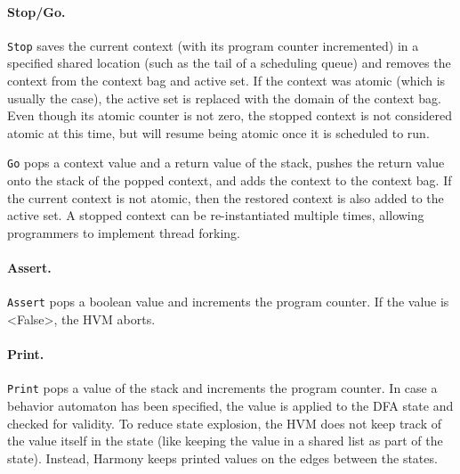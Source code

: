 \documentclass[twocolumn]{article}
\begin{document}

\paragraph{Stop/Go.} \texttt{Stop} saves the current context
(with its program counter incremented) in a specified shared location
(such as the tail of a scheduling queue) and removes the context
from the context bag and active set.  If the context was atomic
(which is usually the case), the active set is replaced with the
domain of the context bag.  Even though its atomic counter is not
zero, the stopped context is not considered atomic at this time,
but will resume being atomic once it is scheduled to run.

\texttt{Go} pops a context value and a return value of the stack,
pushes the return value onto the stack of the popped context, and adds
the context to the context bag.  If the current context is not atomic,
then the restored context is also added to the active set.
A stopped context can be re-instantiated multiple times, allowing
programmers to implement thread forking.

\paragraph{Assert.}  \texttt{Assert} pops a boolean value and increments
the program counter.  If the value is <{False}>, the HVM aborts.

\paragraph{Print.}  \texttt{Print} pops a value of the stack and increments
the program counter.  In case a behavior automaton has been specified, the
value is applied to the DFA state and checked for validity.
To reduce state explosion, the HVM does not keep track of the value itself
in the state (like keeping the value in a shared list as part of the state).
Instead, Harmony keeps printed values on the edges between the states.
\end{document}
